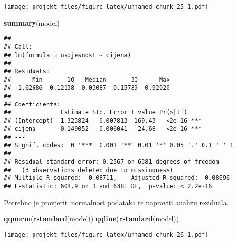 \documentclass[
]{article}
\newenvironment{Shaded}{\begin{snugshade}}{\end{snugshade}}
\newcommand{\DataTypeTok}[1]{\textcolor[rgb]{0.13,0.29,0.53}{#1}}
\newcommand{\KeywordTok}[1]{\textcolor[rgb]{0.13,0.29,0.53}{\textbf{#1}}}
\newcommand{\NormalTok}[1]{#1}
\newcommand{\OperatorTok}[1]{\textcolor[rgb]{0.81,0.36,0.00}{\textbf{#1}}}
\newcommand{\StringTok}[1]{\textcolor[rgb]{0.31,0.60,0.02}{#1}}
\begin{document}
\begin{Shaded}
\end{Shaded}

\texttt{[image: projekt\_files/figure-latex/unnamed-chunk-25-1.pdf]}

\begin{Shaded}
\begin{Highlighting}[]
\KeywordTok{summary}\NormalTok{(model)}
\end{Highlighting}
\end{Shaded}

\begin{verbatim}
## 
## Call:
## lm(formula = uspjesnost ~ cijena)
## 
## Residuals:
##      Min       1Q   Median       3Q      Max 
## -1.62686 -0.12138  0.03087  0.15789  0.92020 
## 
## Coefficients:
##              Estimate Std. Error t value Pr(>|t|)    
## (Intercept)  1.323824   0.007813  169.43   <2e-16 ***
## cijena      -0.149052   0.006041  -24.68   <2e-16 ***
## ---
## Signif. codes:  0 '***' 0.001 '**' 0.01 '*' 0.05 '.' 0.1 ' ' 1
## 
## Residual standard error: 0.2567 on 6381 degrees of freedom
##   (3 observations deleted due to missingness)
## Multiple R-squared:  0.08711,    Adjusted R-squared:  0.08696 
## F-statistic: 608.9 on 1 and 6381 DF,  p-value: < 2.2e-16
\end{verbatim}

Potrebno je provjeriti normalnost podataka te napraviti analizu
reziduala.

\begin{Shaded}
\begin{Highlighting}[]
\KeywordTok{qqnorm}\NormalTok{(}\KeywordTok{rstandard}\NormalTok{(model))}
\KeywordTok{qqline}\NormalTok{(}\KeywordTok{rstandard}\NormalTok{(model))}
\end{Highlighting}
\end{Shaded}

\texttt{[image: projekt\_files/figure-latex/unnamed-chunk-26-1.pdf]}
\end{document}
